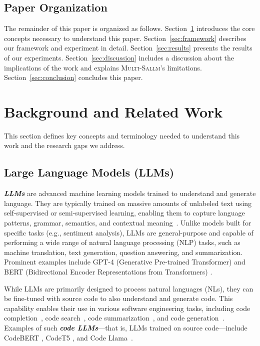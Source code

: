 \documentclass[pdflatex,sn-mathphys-ay]{sn-jnl}
\newcommand{\sandoval}[0]{\textsc{Multi-Sallm}}
\newcommand{\concept}[1]{\textbf{\textsl{#1}}}
\begin{document}
\subsection{Paper Organization}

The remainder of this paper is organized as follows.
Section~\ref{sec:background} introduces the core concepts necessary to understand this paper.
Section~\ref{sec:framework} describes our framework and experiment in detail.
Section~\ref{sec:results} presents the results of our experiments.
Section~\ref{sec:discussion} includes a discussion about the implications of the work and explains \sandoval's limitations.
Section~\ref{sec:conclusion} concludes this paper.

\section{Background and Related Work}\label{sec:background}


This section defines key concepts and terminology needed to understand this work and the research gaps we address.

\subsection{Large Language Models (LLMs)}\label{subsec:LLM}

\concept{LLMs} are advanced machine learning models trained to understand and generate language. They are typically trained on massive amounts of unlabeled text using self-supervised or semi-supervised learning, enabling them to capture language patterns, grammar, semantics, and contextual meaning~\cite{brown2020language}. Unlike models built for specific tasks (e.g., sentiment analysis), LLMs are general-purpose and capable of performing a wide range of natural language processing (NLP) tasks, such as machine translation, text generation, question answering, and summarization. Prominent examples include \textsf{GPT-4} (Generative Pre-trained Transformer) \cite{openai2023gpt4} and \textsf{BERT} (Bidirectional Encoder Representations from Transformers) \cite{bert2018}.

While LLMs are primarily designed to process natural languages (NLs), they can be fine-tuned with source code to also understand and generate code. This capability enables their use in various software engineering tasks, including code completion~\cite{izadi2022codefill,kim2021code,svyatkovskiy2021fast}, code search~\cite{codebert}, code summarization~\cite{gao2022m2ts,mastropaolo2024evaluating}, and code generation~\cite{chen2021codex,raihan2025mojobench}. Examples of such \concept{code LLMs}—that is, LLMs trained on source code—include \textsf{CodeBERT} \cite{codebert}, \textsf{CodeT5} \cite{codet5}, and \textsf{Code Llama}~\cite{CodeLLAMA}.
\end{document}
